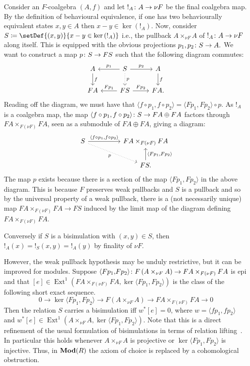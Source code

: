 \documentclass[runningheads]{llncs}
\begin{document}
\begin{proofE}
Consider an $F$-coalgebra $(A, f)$ and let $!_A \colon A\to \nu F$ be the final coalgebra map. By the definition of  behavioural equivalence, if one has two behaviourally equivalent states $x, y \in A$ then $x- y \in \ker{(!_A)}$. 
 Now, consider $S\coloneqq \setDef{(x,y)}{ x-y \in  \ker{(!_A)}  }$ i.e., the pullback $A\times_{\nu F}A$ of $!_A \colon A \to \nu F$ along itself. This is equipped with the obvious projections $p_1, p_2 \colon S \to A.$  We want to construct a map $p\colon S\to FS$ such that the following diagram commutes: 
$$
\begin{tikzcd}
A \dar{f} & \arrow[l, "p_1", swap] S \arrow[d, dotted, "p"]  \rar{p_2}& A\dar{f}
\\
FA & \arrow[l, "Fp_1", swap] FS \rar{Fp_2} & FA.
\end{tikzcd}
$$
Reading off the diagram, we must have that $\langle f\circ p_1, f \circ p_2 \rangle =\langle Fp_1, Fp_2 \rangle  \circ p$. As $!_A$ is a coalgebra map, the map $\langle f\circ p_1, f \circ p_2 \rangle \colon S \to FA \oplus FA$ factors through $FA\times_{F(\nu F)} FA$, seen as a submodule of $FA \oplus FA$, giving a diagram:
$$
\begin{tikzcd}
S \arrow[rr, "\langle f\circ p_1{,} f \circ p_2 \rangle"] \arrow[drr, "p", dotted, swap] && FA\times_{F(\nu F)} FA 
\\
\ && FS. \arrow[u, "\langle Fp_1{, }  Fp_2 \rangle", swap]
\end{tikzcd}
$$
The map $p$ exists because there is a section of the map $\langle Fp_1, Fp_2 \rangle$ in the above diagram.
This is because $F$ preserves weak pullbacks and $S$ is a pullback and so by the universal property of a weak pullback, there is a (not necessarily unique) map $FA\times_{F(\nu F)} FA \to FS$ induced by the limit map of the diagram defining $FA\times_{F(\nu F)} FA$.

Conversely if $S$ is a bisimulation with $ (x,y)\in S$, then $!_A(x) = !_S(x,y) = !_A(y)$ by finality of $\nu F$.
\end{proofE}
However, the weak pullback hypothesis may be unduly restrictive, but it can be improved for modules.
Suppose $\langle Fp_1{, }  Fp_2 \rangle  \colon F\left(A\times_{\nu F}A \right)  \to FA\times_{F(\nu F)}FA$ is epi and that $[e] \in \operatorname{Ext}^1\left(FA\times_{F(\nu F)}FA, \ker \langle Fp_1{, }  Fp_2 \rangle \right)$ is the class of the following short exact sequence.
\begin{equation*}
0\to \ker \langle Fp_1{, }  Fp_2 \rangle \to F\left(A\times_{\nu F}A\right)\to FA\times_{F(\nu F)}FA \to 0
\end{equation*}
Then the relation $S$ carries a bisimulation iff $w^*[e] = 0$, where $w = \langle f p_1, f p_2\rangle$ and $w^*[e] \in \operatorname{Ext}^1\left(A\times_{\nu F}A, \ker \langle Fp_1{, }  Fp_2 \rangle \right)$.
Note that this is a direct refinement of the usual formulation of bisimulations in terms of relation lifting~\cite{Staton2011-Bisim}.
In particular this holds whenever $A\times_{\nu F}A$ is projective or $\ker \langle Fp_1{, }  Fp_2 \rangle$ is injective.
Thus, in $\operatorname{\mathbf{Mod}}(R)$ the axiom of choice is replaced by a cohomological obstruction.
\end{document}
